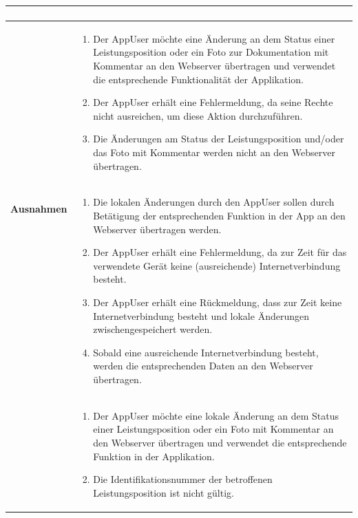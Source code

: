 \begin{longtable}[c]{|p{4cm}|p{10cm}|}
\begin{enumerate}
    \end{enumerate}                                                                                                                                                                                                                                                                                                                                      \\ \hline
    \multirow{2}{*}{\textbf{Ausnahmen}} &
    \begin{enumerate}
        \item Der AppUser m\"ochte eine \"Anderung an dem Status einer Leistungsposition oder ein Foto zur Dokumentation mit Kommentar an den Webserver \"ubertragen und verwendet die entsprechende Funktionalit\"at der Applikation.
        \item Der AppUser erh\"alt eine Fehlermeldung, da seine Rechte nicht ausreichen, um diese Aktion durchzuf\"uhren.
        \item Die \"Anderungen am Status der Leistungsposition und/oder das Foto mit Kommentar werden nicht an den Webserver \"ubertragen.
    \end{enumerate}
    \\\cline{2-2}                 &
    \begin{enumerate}
        \item Die lokalen \"Anderungen durch den AppUser sollen durch Bet\"atigung der entsprechenden Funktion in der App an den Webserver \"ubertragen werden.
        \item Der AppUser erh\"alt eine Fehlermeldung, da zur Zeit f\"ur das verwendete Ger\"at keine (ausreichende) Internetverbindung besteht.
        \item Der AppUser erh\"alt eine R\"uckmeldung, dass zur Zeit keine Internetverbindung besteht und lokale \"Anderungen zwischengespeichert werden.
        \item Sobald eine ausreichende Internetverbindung besteht, werden die entsprechenden Daten an den Webserver \"ubertragen.
    \end{enumerate}
    \\\cline{2-2}                 &
    \begin{enumerate}
        \item Der AppUser m\"ochte eine lokale \"Anderung an dem Status einer Leistungsposition oder ein Foto mit Kommentar an den Webserver \"ubertragen und verwendet die entsprechende Funktion in der Applikation.
        \item Die Identifikationsnummer der betroffenen Leistungsposition ist nicht g\"ultig.

\end{enumerate}
\end{longtable}
